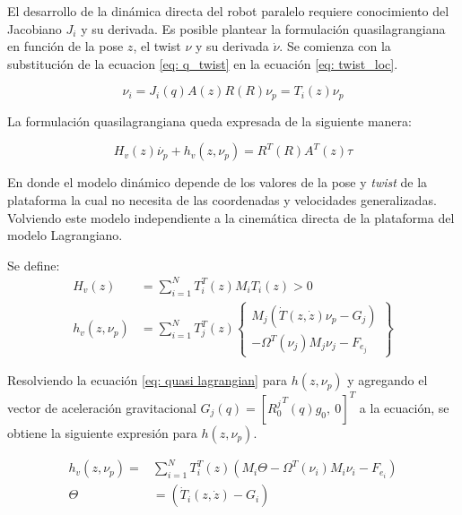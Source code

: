 El desarrollo de la dinámica directa del robot paralelo
requiere conocimiento del Jacobiano $J_i$ y su derivada.
Es posible plantear la formulación quasilagrangiana
en función de la pose $z$, el twist $\nu$ y su derivada $\dot \nu$.
Se comienza con la substitución de la ecuacion 
\eqref{eq: q_twist} en la ecuación \eqref{eq: twist_loc}.

\begin{equation}
\nu_i = J_i(q) A(z) R(R) \nu_p = T_i(z) \nu_p
\end{equation}

La formulación quasilagrangiana queda expresada de la 
siguiente manera:

\begin{equation}\label{eq: quasi lagrangian}
  H_v(z)\dot{\nu_p}+h_v(z,\nu_p) = R^T(R) A^T(z)\tau
\end{equation}


En donde el modelo dinámico depende de los valores de la pose y \emph{twist} de la plataforma la cual no necesita de las coordenadas y velocidades generalizadas. Volviendo este modelo independiente a la cinemática directa de la plataforma del modelo Lagrangiano.

Se define:
\begin{subequations}
 \begin{align}
  H_v(z) &= \sum_{i=1}^N T_i^T (z) M_i T_i(z) > 0\\
  h_v (z, \nu_p) &= \sum_{i=1}^N T_j^T (z) \begin{Bmatrix}
                                           M_j (\dot T(z, \dot z)\nu_p -G_j) \\
                                           - \Omega^T (\nu_j) M_j \nu_j - F_{e_j}
                                          \end{Bmatrix}
 \end{align}
\end{subequations}

Resolviendo la ecuación \eqref{eq: quasi lagrangian}
para $h(z,\nu_p)$ y agregando el vector de 
aceleración gravitacional 
$G_j(q) = [{R_0^j}^T(q)g_0, \ 0 ]^T$ a la ecuación, 
se obtiene la siguiente expresión para $h(z,\nu_p)$.

\begin{subequations}
\begin{align}
 h_v(z,\nu_p) = & \sum_{i=1}^N T_i^T(z)  \left( M_i \Theta  - \Omega^T(\nu_i)M_i\nu_i - F_{e_i} \right)\\
 \Theta & = \left(\dot T_i (z,\dot z) - G_i \right)
\end{align}
\end{subequations}



